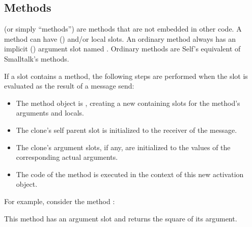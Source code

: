 \documentclass[letterpaper,10pt,english]{sphinxmanual}
\begin{document}
\subsection{Methods}
\label{\detokenize{langref:index-19}}\label{\detokenize{langref:methods}}\label{\detokenize{langref:pp-methods}}
 (or simply “methods”) are methods that are not embedded in other code. A
method can have  ({\hyperref[\detokenize{langref:pp-argument-slots}]{}}) and/or local slots. An ordinary method always has an implicit
 ({\hyperref[\detokenize{langref:pp-parent-slots}]{}}) argument slot named . Ordinary methods are Self’s equivalent of
Smalltalk’s methods.

If a slot contains a method, the following steps are performed when the slot is evaluated as the result
of a message send:
\begin{itemize}
\item {} 
The method object is , creating a new  containing slots for the method’s arguments and locals.

\item {} 
The clone’s self parent slot is initialized to the receiver of the message.

\item {} 
The clone’s argument slots, if any, are initialized to the values of the corresponding actual arguments.

\item {} 
The code of the method is executed in the context of this new activation object.

\end{itemize}

For example, consider the method :
\begin{figure}[htbp]
\centering

\noindent{}
\end{figure}

This method has an argument slot  and returns the square of its argument.

\end{document}
